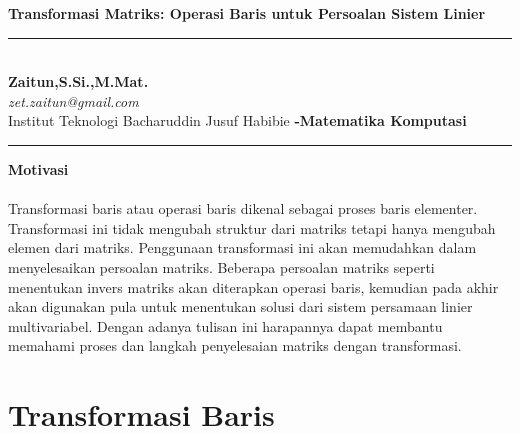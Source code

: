 \documentclass{article}   %
\begin{document}
	
	\begin{center}
		\vspace{.4cm}
		\textsf{\textbf { \large Transformasi Matriks: Operasi Baris untuk Persoalan Sistem Linier \@Judul }}
	\end{center}
\vspace{.4cm}
	\hrule
	\textsf{\\
	\textbf{Zaitun,S.Si.,M.Mat.} \hspace{\fill}
	\textit{\large }\\ [0.7ex]
	\textit{zet.zaitun@gmail.com} \hspace{\fill} \textbf{}\\ [0.7ex]
	Institut Teknologi Bacharuddin Jusuf Habibie \hspace{\fill} \textbf{-Matematika Komputasi}} \\
		\hrule
		
		
		\vspace{.4cm}
		\begin{center}
			\textbf{\Large Motivasi}
		\end{center}
\paragraph*{} 
Transformasi baris atau operasi baris dikenal sebagai proses baris elementer. Transformasi ini tidak mengubah struktur dari matriks tetapi hanya mengubah elemen dari matriks. Penggunaan transformasi ini akan memudahkan dalam menyelesaikan persoalan matriks. Beberapa persoalan matriks seperti menentukan invers matriks akan diterapkan operasi baris, kemudian pada akhir akan digunakan pula untuk menentukan solusi dari sistem persamaan linier multivariabel. Dengan adanya tulisan ini harapannya dapat membantu memahami proses dan langkah penyelesaian matriks dengan transformasi.
		\section{Transformasi Baris}
\end{document}
